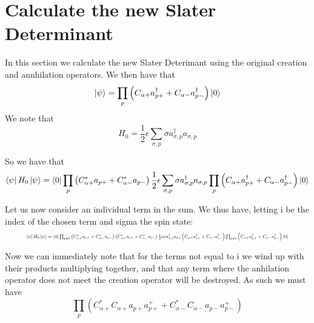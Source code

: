 \documentclass[11pt]{article} %
\begin{document}
\section{Calculate the new Slater Determinant}

In this section we calculate the new Slater Deterimant using the original creation and annhilation operators. We then have that \\
\begin{equation} \ket{\psi}=\prod_p \left(C_{\alpha+}a_{p+}^\dagger+C_{\alpha -}a_{p -}^\dagger \right)\ket{0} \end{equation}We note that \\

\begin{equation} H_0=\frac{1}{2}\epsilon \sum_{\sigma,p} \sigma a_{\sigma,p}^\dagger a_{\sigma,p} \end{equation}

So we have that\\

\begin{equation} \bra{\psi} H_0 \ket{\psi}=\bra{0}\prod_p \left(C_{\alpha+}^*a_{p+}+C_{\alpha -}^*a_{p -}\right) \frac{1}{2}\epsilon \sum_{\sigma,p} \sigma a_{\sigma,p}^\dagger a_{\sigma,p}\prod_p \left(C_{\alpha+}a_{p+}^\dagger+C_{\alpha -}a_{p -}^\dagger \right) \ket{0}\end{equation}



Let us now consider an individual term in the sum. We thus have, letting i be the index of the chosen term and sigma the spin state:\\
\begin{equation}\resizebox{.9\linewidth}{!}{$
 \bra{\psi} H_0 \ket{\psi}=\bra{0}\prod_{p\neq i} \left(C_{\alpha+}^*a_{p+}+C_{\alpha -}^*a_{p -} \right)\left(C_{\alpha+}^*a_{i+}+C_{\alpha -}^*a_{i -} \right) \frac{1}{2}\epsilon  \sigma a_{\sigma,i}^\dagger a_{\sigma,i}\left(C_{\alpha+}a_{i+}^\dagger+C_{\alpha -}a_{i -}^\dagger \right)\prod_{p\neq i} \left(C_{\alpha+}a_{p+}^\dagger+C_{\alpha -}a_{p -}^\dagger \right) \ket{0} $}\end{equation}

Now we can immediately note that for the terms not equal to i we wind up with their products multiplying together, and that any term where the anhilation operator does not meet the creation operator will be destroyed. As such we must have\\

\begin{equation}
\prod_{p}\left(C_{\alpha+}^*C_{\alpha+}a_{p+}a_{p+}^++C_{\alpha-}^*C_{\alpha-}a_{p-}a_{p-}^+\right)\end{equation}
\end{document}
